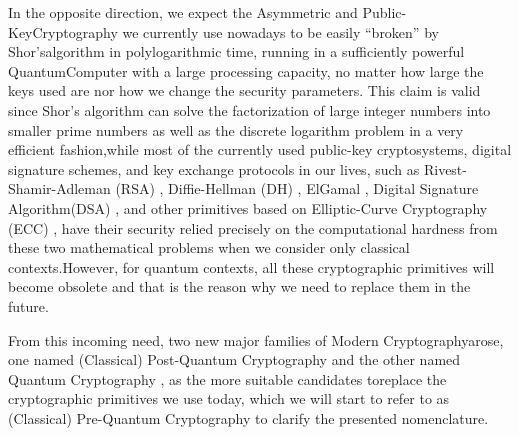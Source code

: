 \documentclass[runningheads]{llncs}
\numberwithin{equation}{section}
\begin{document}
    In the opposite direction, we expect the Asymmetric and Public-Key\break Cryptography we currently use nowadays to be easily ``broken'' by Shor's\break algorithm in polylogarithmic time, running in a sufficiently powerful Quantum\break Computer with a large processing capacity, no matter how large the keys used are nor how we change the security parameters. This claim is valid since Shor's algorithm can solve the factorization of large integer numbers into smaller prime numbers as well as the discrete logarithm problem in a very efficient fashion,\break while most of the currently used public-key cryptosystems, digital signature schemes, and key exchange protocols in our lives, such as Rivest-Shamir-Adleman (RSA) \cite{rivest-shamir-adleman:method-digital-signatures-and-public-key-cryptosystems:1978:06-2024}, Diffie-Hellman (DH) \cite{diffie-hellman:new-directions-cryptography:1976:06-2024,merkle:secure-communications-over-insecure-channels:1978:06-2024}, ElGamal \cite{elgamal:public-key-cryptosystem-signature-scheme-based-discrete-logarithms:1985:06-2024}, Digital Signature Algorithm\break (DSA) \cite{schnorr:efficient-identification-and-signatures-smart-card:1990:06-2024,schnorr:efficient-signature-generation-smart-cards:1991:06-2024,chen-moody-regenscheid-robinson:digital-signature-standard:2023:06-2024}, and other primitives based on Elliptic-Curve Cryptography (ECC) \cite{miller:use-elliptic-curves-cryptography:1986:06-2024,koblitz:elliptic-curve-cryptosystems:1987:06-2024}, have their security relied precisely on the computational hardness from these two mathematical problems when we consider only classical contexts.\break However, for quantum contexts, all these cryptographic primitives will become obsolete and that is the reason why we need to replace them in the future.

    From this incoming need, two new major families of Modern Cryptography\break arose, one named (Classical) Post-Quantum Cryptography \cite{bernstein-buchmann-dahmen:post-quantum-cryptography:2009:06-2024,bernstein-lange:post-quantum-cryptography:2017:06-2024} and the other named Quantum Cryptography \cite{wiesner:conjugate-coding:1983:06-2024,brassard-crepeau:quantum-cryptography:2005:06-2024,ekert:quantum-cryptography-based-bell-theorem:1991:06-2024,pirandola-et-al:advances-quantum-cryptography:2020:06-2024,grasselli:quantum-cryptography-key-distribution-conference-key-agreement:2021:06-2024,vidick-wehner:introduction-quantum-cryptographic:2023:06-2024}, as the more suitable candidates to\break replace the cryptographic primitives we use today, which we will start to refer to as (Classical) Pre-Quantum Cryptography to clarify the presented nomenclature.    
    
\end{document}
